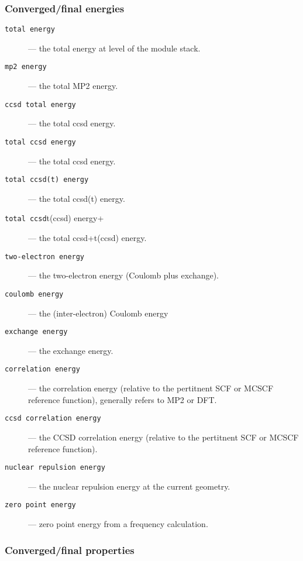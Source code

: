 \subsubsection{Converged/final energies}

\begin{description}
\item [\verb+total energy+] --- the total energy at level of the module stack.
\item [\verb+mp2 energy+] --- the total MP2 energy.
\item [\verb+ccsd total energy+] --- the total ccsd energy.
\item [\verb+total ccsd energy+] --- the total ccsd energy.
\item [\verb+total ccsd(t) energy+] --- the total ccsd(t) energy.
\item [\verb+total ccsd+t(ccsd) energy+] --- the total ccsd+t(ccsd) energy.
\item [\verb+two-electron energy+] --- the two-electron energy
(Coulomb plus exchange).
\item [\verb+coulomb energy+] --- the (inter-electron) Coulomb
  energy
\item [\verb+exchange energy+] --- the exchange energy.
\item [\verb+correlation energy+] --- the correlation energy
  (relative to the pertitnent SCF or MCSCF reference function), generally refers 
  to MP2 or DFT.
\item [\verb+ccsd correlation energy+] --- the CCSD correlation energy
  (relative to the pertitnent SCF or MCSCF reference function).
\item [\verb+nuclear repulsion energy+] --- the nuclear repulsion
  energy at the current geometry.
\item [\verb+zero point energy+] --- zero point energy from a frequency calculation.
\end{description}

\subsubsection{Converged/final properties}

